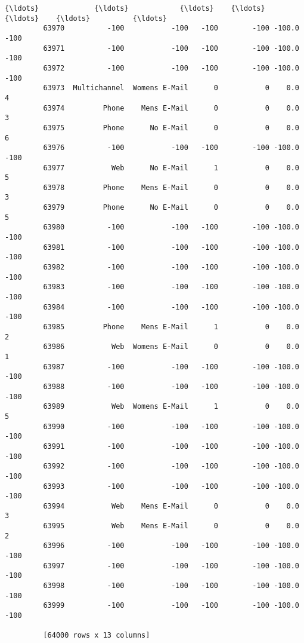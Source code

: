 \documentclass[11pt]{article}
\begin{document}
\begin{Verbatim}[commandchars=\\\{\}]
         {\ldots}             {\ldots}            {\ldots}    {\ldots}         {\ldots}    {\ldots}          {\ldots}  
         63970          -100           -100   -100        -100 -100.0         -100  
         63971          -100           -100   -100        -100 -100.0         -100  
         63972          -100           -100   -100        -100 -100.0         -100  
         63973  Multichannel  Womens E-Mail      0           0    0.0            4  
         63974         Phone    Mens E-Mail      0           0    0.0            3  
         63975         Phone      No E-Mail      0           0    0.0            6  
         63976          -100           -100   -100        -100 -100.0         -100  
         63977           Web      No E-Mail      1           0    0.0            5  
         63978         Phone    Mens E-Mail      0           0    0.0            3  
         63979         Phone      No E-Mail      0           0    0.0            5  
         63980          -100           -100   -100        -100 -100.0         -100  
         63981          -100           -100   -100        -100 -100.0         -100  
         63982          -100           -100   -100        -100 -100.0         -100  
         63983          -100           -100   -100        -100 -100.0         -100  
         63984          -100           -100   -100        -100 -100.0         -100  
         63985         Phone    Mens E-Mail      1           0    0.0            2  
         63986           Web  Womens E-Mail      0           0    0.0            1  
         63987          -100           -100   -100        -100 -100.0         -100  
         63988          -100           -100   -100        -100 -100.0         -100  
         63989           Web  Womens E-Mail      1           0    0.0            5  
         63990          -100           -100   -100        -100 -100.0         -100  
         63991          -100           -100   -100        -100 -100.0         -100  
         63992          -100           -100   -100        -100 -100.0         -100  
         63993          -100           -100   -100        -100 -100.0         -100  
         63994           Web    Mens E-Mail      0           0    0.0            3  
         63995           Web    Mens E-Mail      0           0    0.0            2  
         63996          -100           -100   -100        -100 -100.0         -100  
         63997          -100           -100   -100        -100 -100.0         -100  
         63998          -100           -100   -100        -100 -100.0         -100  
         63999          -100           -100   -100        -100 -100.0         -100  
         
         [64000 rows x 13 columns]
\end{Verbatim}
            

    
    
    
    
\end{document}
